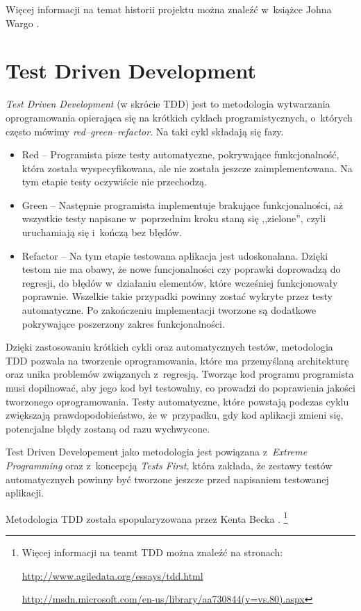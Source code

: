 \documentclass[brudnopis]{xmgr}
\begin{document}
Więcej informacji na temat historii projektu można znaleźć w~książce Johna Wargo \cite{Wargo}. 

\section{Test Driven Development}

\textit{Test Driven Development} (w skrócie TDD) jest to metodologia wytwarzania oprogramowania opierająca się na krótkich cyklach programistycznych, o~których często mówimy \textit{red--green--refactor}. Na taki cykl składają się fazy.
\begin{itemize}
  \item Red -- Programista pisze testy automatyczne, pokrywające funkcjonalność, która została wyspecyfikowana, ale nie została jeszcze zaimplementowana. Na tym etapie testy oczywiście nie przechodzą.
  \item Green -- Następnie programista implementuje brakujące funkcjonalności, aż wszystkie testy napisane w~poprzednim kroku staną się ,,zielone'', czyli uruchamiają się i~kończą bez błędów.
  \item Refactor -- Na tym etapie testowana aplikacja jest udoskonalana. Dzięki testom nie ma obawy, że nowe funcjonalności czy poprawki doprowadzą do regresji, do błędów w~działaniu elementów, które wcześniej funkcjonowały poprawnie. Wszelkie takie przypadki powinny zostać wykryte przez testy automatyczne. Po zakończeniu implementacji tworzone są dodatkowe pokrywające poszerzony zakres funkcjonalności.
\end{itemize}

Dzięki zastosowaniu krótkich cykli oraz automatycznych testów, metodologia TDD pozwala na tworzenie oprogramowania, które ma przemyślaną architekturę oraz unika problemów związanych z~regresją. Tworząc kod  programu programista musi dopilnować, aby jego kod był testowalny, co prowadzi do poprawienia jakości tworzonego oprogramowania. Testy automatyczne, które powstają podczas cyklu zwiększają prawdopodobieństwo, że w~przypadku, gdy kod aplikacji zmieni się, potencjalne błędy zostaną od razu wychwycone. 

Test Driven Developement jako metodologia jest powiązana z~\textit{Extreme Programming} oraz z~koncepcją \textit{Tests First}, która zakłada, że zestawy testów automatycznych powinny być tworzone jeszcze przed napisaniem testowanej aplikacji.

Metodologia TDD została spopularyzowana przez Kenta Becka \cite{Beck}.
\footnote{
Więcej informacji na teamt TDD można znaleźć na stronach:

\url{http://www.agiledata.org/essays/tdd.html}

\url{http://msdn.microsoft.com/en-us/library/aa730844(v=vs.80).aspx}
}
\end{document}
